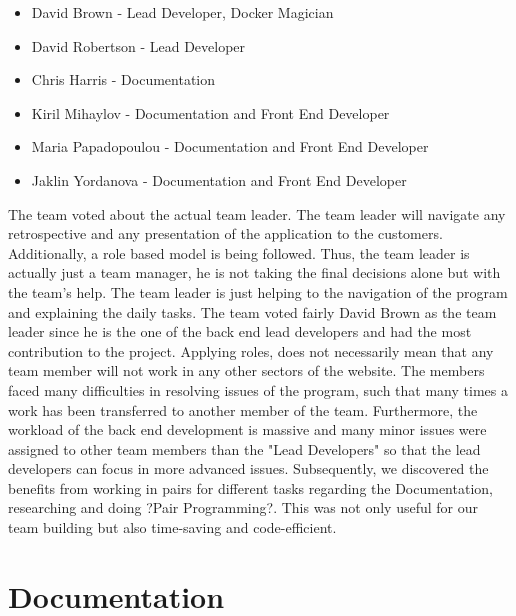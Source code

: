 \documentclass{l3proj}
\begin{document}
\begin{itemize}

\item David Brown - Lead Developer, Docker Magician

\item David Robertson - Lead Developer

\item Chris Harris - Documentation

\item Kiril Mihaylov - Documentation and Front End Developer

\item Maria Papadopoulou - Documentation and Front End Developer

\item Jaklin Yordanova - Documentation and Front End Developer

\end{itemize}
The team voted about the actual team leader. The team leader will navigate any retrospective and any presentation of the application to the customers. Additionally, a role based model is being followed. Thus, the team leader is actually just a team manager, he is not taking the final decisions alone but with the team's help. The team leader is just helping to the navigation of the program and explaining the daily tasks. The team voted fairly David Brown as the team leader since he is the one of the back end lead developers and had the most contribution to the project. Applying roles, does not necessarily mean that any team member will not work in any other sectors of the website. The members faced many difficulties in resolving issues of the program, such that many times a work has been transferred to another member of the team. Furthermore, the workload of the back end development is massive and many minor issues were assigned to other team members than the "Lead Developers" so that the lead developers can focus in more advanced issues. Subsequently, we discovered the benefits from working in pairs for different tasks regarding the Documentation, researching and doing ?Pair Programming?. This was not only useful for our team building but also time-saving and code-efficient.


\section{Documentation}
\label{documentation}
\end{document}
